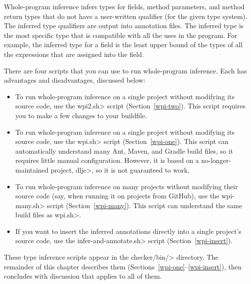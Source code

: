 
Whole-program inference
infers types for fields, method parameters, and method return types that do not
have a user-written qualifier (for the given type system).
The inferred type qualifiers are output into annotation files.
The inferred type is the most specific type that is compatible with all the
uses in the program.  For example, the inferred type for a field is the
least upper bound of the types of all the expressions that are assigned
into the field.

There are four scripts that you can use to run whole-program inference.
Each has advantages and disadvantages, discussed below:

\begin{itemize}
    \item
    To run whole-program inference on a single project without modifying its
    source code, use the \<wpi2.sh> script (Section~\ref{wpi-two}). This script
    requires you to make a few changes to your buildfile.

    \item
    To run whole-program inference on a single project without modifying its source code,
    use the \<wpi.sh> script (Section~\ref{wpi-one}). This script can automatically understand
    many Ant, Maven, and Gradle build files, so it requires little manual configuration.
    However, it is based on a no-longer-maintained project, \<dljc>, so it is not guaranteed to work.

    \item
    To run whole-program inference on many projects without modifying their source code
    (say, when running it on projects from GitHub), use the \<wpi-many.sh> script (Section~\ref{wpi-many}).
    This script can understand the same build files as \<wpi.sh>.

    \item
    If you want to insert the inferred annotations directly into a single
    project's source code, use the \<infer-and-annotate.sh> script (Section~\ref{wpi-insert}).
\end{itemize}

These type inference scripts appear in the \<checker/bin/> directory.
The remainder of this chapter describes them
(Sections~\ref{wpi-one}--\ref{wpi-insert}), then concludes with discussion
that applies to all of them.



